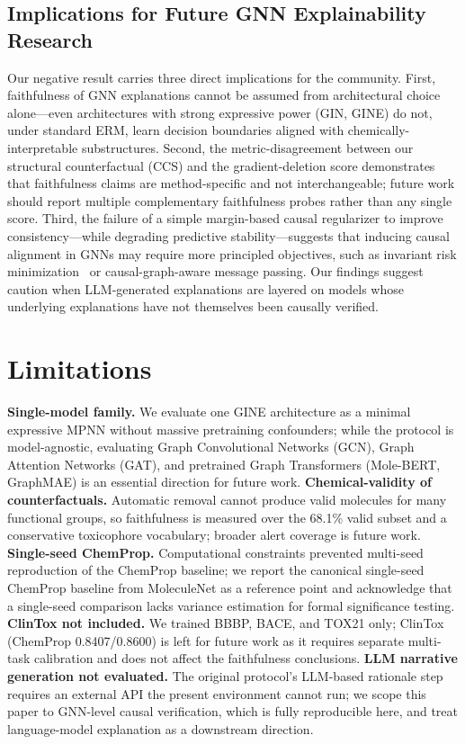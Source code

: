 \documentclass[a4paper,fleqn]{cas-dc}
\newcommand{\ChemClin}{0.8407/0.8600}
\begin{document}
\subsection*{Implications for Future GNN Explainability Research}
Our negative result carries three direct implications for the community.
First, faithfulness of GNN explanations cannot be assumed from architectural
choice alone---even architectures with strong expressive power (GIN, GINE)
do not, under standard ERM, learn decision boundaries aligned with
chemically-interpretable substructures. Second, the metric-disagreement
between our structural counterfactual (CCS) and the gradient-deletion score
demonstrates that faithfulness claims are method-specific and
not interchangeable; future work should report multiple complementary
faithfulness probes rather than any single score. Third, the failure of a
simple margin-based causal regularizer to improve consistency---while
degrading predictive stability---suggests that inducing causal alignment
in GNNs may require more principled objectives, such as invariant risk
minimization~\cite{arjovsky2019invariant} or causal-graph-aware message
passing. Our findings suggest caution when LLM-generated explanations are
layered on models whose underlying explanations have not themselves been
causally verified.

\section{Limitations}
\textbf{Single-model family.} We evaluate one GINE architecture as a minimal expressive MPNN without massive pretraining confounders; while the protocol is model-agnostic, evaluating Graph Convolutional Networks (GCN), Graph Attention Networks (GAT), and pretrained Graph Transformers (Mole-BERT, GraphMAE) is an essential direction for future work. \textbf{Chemical-validity of counterfactuals.} Automatic removal cannot produce valid molecules for many functional groups, so faithfulness is measured over the 68.1\% valid subset and a conservative toxicophore vocabulary; broader alert coverage is future work. \textbf{Single-seed ChemProp.} Computational constraints prevented multi-seed reproduction of the ChemProp baseline; we report the canonical single-seed ChemProp baseline from MoleculeNet as a reference point and acknowledge that a single-seed comparison lacks variance estimation for formal significance testing. \textbf{ClinTox not included.} We trained BBBP, BACE, and TOX21 only; ClinTox (ChemProp \ChemClin) is left for future work as it requires separate multi-task calibration and does not affect the faithfulness conclusions. \textbf{LLM narrative generation not evaluated.} The original protocol's LLM-based rationale step requires an external API the present environment cannot run; we scope this paper to GNN-level causal verification, which is fully reproducible here, and treat language-model explanation as a downstream direction.
\end{document}
